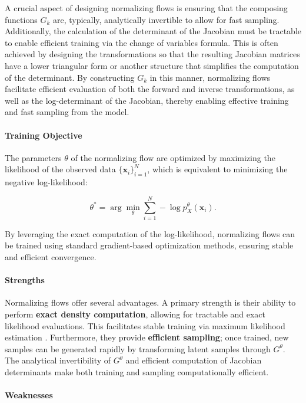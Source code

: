 A crucial aspect of designing normalizing flows is ensuring that the composing functions \( G_k \) are, typically, analytically invertible to allow for fast sampling. Additionally, the calculation of the determinant of the Jacobian must be tractable to enable efficient training via the change of variables formula. This is often achieved by designing the transformations so that the resulting Jacobian matrices have a lower triangular form or another structure that simplifies the computation of the determinant. By constructing \( G_k \) in this manner, normalizing flows facilitate efficient evaluation of both the forward and inverse transformations, as well as the log-determinant of the Jacobian, thereby enabling effective training and fast sampling from the model.
\paragraph{Training Objective}

The parameters $\theta$ of the normalizing flow are optimized by maximizing the likelihood of the observed data $\{\mathbf{x}_i\}_{i=1}^N$, which is equivalent to minimizing the negative log-likelihood:

\[
\theta^* = \arg \min_{\theta} \sum_{i=1}^N -\log p^\theta_X(\mathbf{x}_i).
\]

By leveraging the exact computation of the log-likelihood, normalizing flows can be trained using standard gradient-based optimization methods, ensuring stable and efficient convergence.

\paragraph{Strengths}

Normalizing flows offer several advantages. A primary strength is their ability to perform \textbf{exact density computation}, allowing for tractable and exact likelihood evaluations. This facilitates stable training via maximum likelihood estimation \cite{papamakarios2019normalizing}. Furthermore, they provide \textbf{efficient sampling}; once trained, new samples can be generated rapidly by transforming latent samples through \( G^\theta \). The analytical invertibility of \( G^\theta \) and efficient computation of Jacobian determinants make both training and sampling computationally efficient.

\paragraph{Weaknesses}

